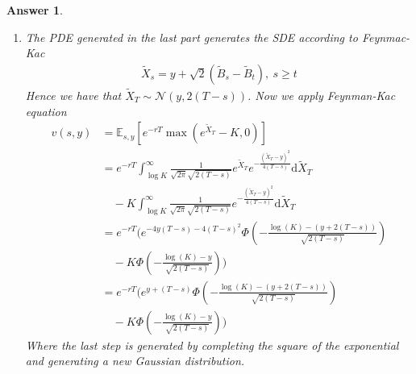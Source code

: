 \documentclass[12pt]{article}
\theoremstyle{colon}
\newtheorem*{answer}{Answer}
\begin{document}
\begin{answer}
\begin{enumerate}[label=\alph*)]
\begin{align*}
        &= 0
      \end{align*}
      But, by substituting the equivalent derivatives, we get
      \begin{gather*}
        \frac{\sigma^2}{2} \partial_s v(s,y) + \left(\frac{\sigma^2}{2} - 2 \right) \partial_y v(s,y) + r \partial_y v(s,y) -\frac{\sigma^2}{2} \partial_y v(s,y) + \frac{\sigma^2}{2} \partial_{yy} v(s,y) \\
        \implies \partial_s v(s,y) + \partial_{yy} v(s,y) = 0
      \end{gather*}
      Where the final condition is direct from $v(T, y) = e^{-rT} u(T, e^y) = \max(e^y - K, 0)$

    \item The PDE generated in the last part generates the SDE according to Feynmac-Kac
      \begin{gather*}
        \tilde{X}_s = y + \sqrt{2} (\tilde{B}_s - \tilde{B}_t), \ s \geq t
      \end{gather*}
      Hence we have that $\tilde{X}_T \sim \mathcal{N}(y, 2(T-s))$. Now we apply Feynman-Kac equation
      \begin{align*}
        v(s,y) &= \mathbb{E}_{s,y} [e^{-rT} \max(e^{\tilde{X}_T} - K, 0)] \\
        &= e^{-rT} \int_{\log K}^\infty \frac{1}{\sqrt{2 \pi}\sqrt{2(T-s)}} e^{\tilde{X}_T} e^{-\frac{(\tilde{X}_T - y)^2}{4(T-s)}} \text{d} \tilde{X}_T \\
        &\quad - K \int_{\log K}^\infty \frac{1}{\sqrt{2 \pi}\sqrt{2(T-s)}} e^{-\frac{(\tilde{X}_T - y)^2}{4(T-s)}} \text{d} \tilde{X}_T \\
        &= e^{-rT} \Bigg( e^{-4y(T-s) - 4(T-s)^2} \Phi \left(-\frac{\log (K) - (y+ 2(T-s))}{\sqrt{2(T-s)}} \right) \\
        &\quad - K \Phi \left(-\frac{\log (K) - y}{\sqrt{2(T-s)}} \right) \Bigg) \\
        &= e^{-rT} \Bigg( e^{y+(T-s)} \Phi \left(-\frac{\log (K) - (y+ 2(T-s))}{\sqrt{2(T-s)}} \right) \\
        &\quad - K \Phi \left(-\frac{\log (K) - y}{\sqrt{2(T-s)}} \right) \Bigg)
      \end{align*}
      Where the last step is generated by completing the square of the exponential and generating a new Gaussian distribution.


\end{enumerate}
\end{answer}
\end{document}
